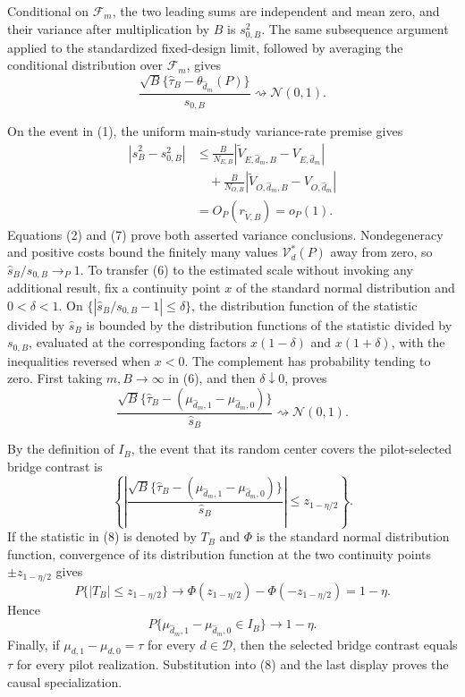 Conditional on \(\mathcal F_m\), the two leading sums are independent and mean zero, and their variance after multiplication by \(B\) is \(s_{0,B}^2\).  The same subsequence argument applied to the standardized fixed-design limit, followed by averaging the conditional distribution over \(\mathcal F_m\), gives
\[
 \frac{\sqrt B\{\widehat\tau_B-\theta_{\widehat d_m}(P)\}}
 {s_{0,B}}\rightsquigarrow\mathcal N(0,1).                               \tag{6}
\]

On the event in (1), the uniform main-study variance-rate premise gives
\[
\begin{aligned}
 |\widehat s_B^2-s_{0,B}^2|
 &\le \frac B{N_{E,B}}
 |\widetilde V_{E,\widehat d_m,B}-V_{E,\widehat d_m}|\\
 &\quad+\frac B{N_{O,B}}
 |\widetilde V_{O,\widehat d_m,B}-V_{O,\widehat d_m}|\\
 &=O_P(r_{\widetilde V,B})=o_P(1).
\end{aligned}                                                              \tag{7}
\]
Equations (2) and (7) prove both asserted variance conclusions.  Nondegeneracy and positive costs bound the finitely many values \(\mathcal V_d^*(P)\) away from zero, so \(\widehat s_B/s_{0,B}\to_P1\).  To transfer (6) to the estimated scale without invoking any additional result, fix a continuity point \(x\) of the standard normal distribution and \(0<\delta<1\).  On \(\{|\widehat s_B/s_{0,B}-1|\le\delta\}\), the distribution function of the statistic divided by \(\widehat s_B\) is bounded by the distribution functions of the statistic divided by \(s_{0,B}\), evaluated at the corresponding factors \(x(1-\delta)\) and \(x(1+\delta)\), with the inequalities reversed when \(x<0\).  The complement has probability tending to zero.  First taking \(m,B\to\infty\) in (6), and then \(\delta\downarrow0\), proves
\[
 \frac{\sqrt B\{\widehat\tau_B-(\mu_{\widehat d_m,1}-\mu_{\widehat d_m,0})\}}
 {\widehat s_B}\rightsquigarrow\mathcal N(0,1).                          \tag{8}
\]

By the definition of \(I_B\), the event that its random center covers the pilot-selected bridge contrast is
\[
 \left\{
 \left|
 \frac{\sqrt B\{\widehat\tau_B-(\mu_{\widehat d_m,1}-\mu_{\widehat d_m,0})\}}
 {\widehat s_B}
 \right|\le z_{1-\eta/2}
 \right\}.
\]
If the statistic in (8) is denoted by \(T_B\) and \(\Phi\) is the standard normal distribution function, convergence of its distribution function at the two continuity points \(\pm z_{1-\eta/2}\) gives
\[
 P\{|T_B|\le z_{1-\eta/2}\}
 \longrightarrow
 \Phi(z_{1-\eta/2})-\Phi(-z_{1-\eta/2})=1-\eta.
\]
Hence
\[
 P\{\mu_{\widehat d_m,1}-\mu_{\widehat d_m,0}\in I_B\}\longrightarrow1-\eta.
\]
Finally, if \(\mu_{d,1}-\mu_{d,0}=\tau\) for every \(d\in\mathcal D\), then the selected bridge contrast equals \(\tau\) for every pilot realization.  Substitution into (8) and the last display proves the causal specialization.
